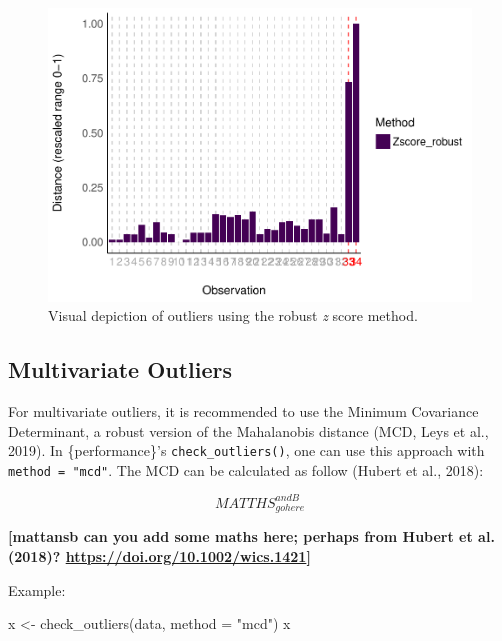 \documentclass[
]{article}
\newenvironment{Shaded}{\begin{snugshade}}{\end{snugshade}}
\newcommand{\AttributeTok}[1]{\textcolor[rgb]{0.77,0.63,0.00}{#1}}
\newcommand{\FunctionTok}[1]{\textcolor[rgb]{0.00,0.00,0.00}{#1}}
\newcommand{\NormalTok}[1]{#1}
\newcommand{\OtherTok}[1]{\textcolor[rgb]{0.56,0.35,0.01}{#1}}
\newcommand{\StringTok}[1]{\textcolor[rgb]{0.31,0.60,0.02}{#1}}
\begin{document}
\begin{figure}
\includegraphics[width=1\linewidth]{paper_files/figure-latex/univariate-1} \caption{Visual depiction of outliers using the robust \emph{z} score method.}\label{fig:univariate}
\end{figure}

\hypertarget{multivariate-outliers}{%
\subsection{Multivariate Outliers}\label{multivariate-outliers}}

For multivariate outliers, it is recommended to use the Minimum Covariance Determinant, a robust version of the Mahalanobis distance (MCD, Leys et al., 2019). In \{performance\}'s \texttt{check\_outliers()}, one can use this approach with \texttt{method\ =\ "mcd"}. The MCD can be calculated as follow (Hubert et al., 2018):

\[
MATTHS_{gohere}^{andB}
\]

\textbf{{[}mattansb can you add some maths here; perhaps from Hubert et al. (2018)? \url{https://doi.org/10.1002/wics.1421}{]}}

Example:



\begin{Shaded}
\begin{Highlighting}[]
\NormalTok{x }\OtherTok{\textless{}{-}} \FunctionTok{check\_outliers}\NormalTok{(data, }\AttributeTok{method =} \StringTok{"mcd"}\NormalTok{)}
\NormalTok{x}
\end{Highlighting}
\end{Shaded}
\end{document}
